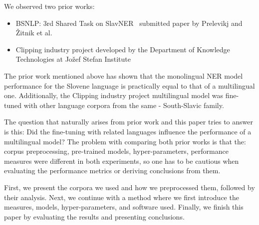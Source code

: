 \documentclass[sigconf]{acmart}
\begin{document}
We observed two prior works:
\begin{itemize}
\item BSNLP: 3rd Shared Task on SlavNER~\cite{piskorski-etal-2021-slav} submitted paper by Prelevikj and Žitnik et al.~\cite{prelevikj-zitnik-2021-multilingual}
\item Clipping industry project developed by the Department of Knowledge Technologies at Jožef Stefan Institute~\cite{KTIJS}
\end{itemize}
The prior work mentioned above has shown that the monolingual NER model performance for the Slovene language is practically equal to that of a multilingual one.
Additionally, the Clipping industry project multilingual model was fine-tuned with other language corpora from the same - South-Slavic family.

The question that naturally arises from prior work and this paper tries to answer is this: Did the fine-tuning with related languages influence the performance of a multilingual model?
The problem with comparing both prior works is that the: corpus preprocessing, pre-trained models, hyper-parameters, performance measures were different in both experiments, so one has to be cautious when evaluating the performance metrics or deriving conclusions from them.

First, we present the corpora we used and how we preprocessed them, followed by their analysis.
Next, we continue with a method where we first introduce the measures, models, hyper-parameters, and software used.
Finally, we finish this paper by evaluating the results and presenting conclusions.
\end{document}
